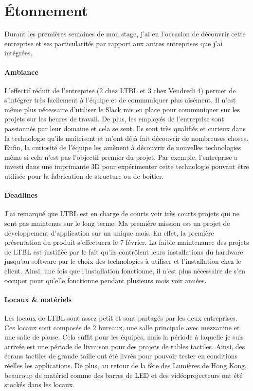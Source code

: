 \documentclass{article}
\begin{document}
\section{Étonnement}

Durant les premières semaines de mon stage, j'ai eu l'occasion de découvrir cette entreprise et ses particularités par rapport aux autres entreprises que j'ai intégrées.

\paragraph{Ambiance} L'effectif réduit de l'entreprise (2 chez LTBL et 3 chez Vendredi 4) permet de s'intégrer très facilement à l'équipe et de communiquer plus aisément.
Il n'est même plus nécessaire d'utiliser le Slack mis en place pour communiquer sur les projets sur les heures de travail.
De plus, les employés de l'entreprise sont passionnés par leur domaine et cela se sent.
Ils sont très qualifiés et curieux dans la technologie qu'ils maîtrisent et m'ont déjà fait découvrir de nombreuses choses.
Enfin, la curiosité de l'équipe les amènent à découvrir de nouvelles technologies même si cela n'est pas l'objectif premier du projet.
Par exemple, l'entreprise a investi dans une imprimante 3D pour expérimenter cette technologie pouvant être utilisée pour la fabrication de structure ou de boîtier.

\paragraph{Deadlines} J'ai remarqué que LTBL est en charge de courts voir très courts projets qui ne sont pas maintenus sur le long terme.
Ma première mission est un projet de développement d'application sur un unique mois.
En effet, la première présentation du produit s'effectuera le 7 février.
La faible maintenance des projets de LTBL est justifiée par le fait qu'ils contrôlent leurs installations du hardware jusqu'au software par le choix des technologies à utiliser et l'installation chez le client.
Ainsi, une fois que l'installation fonctionne, il n'est plus nécessaire de s'en occuper pour qu'elle fonctionne pendant plusieurs mois voir années.

\paragraph{Locaux \& matériels} Les locaux de LTBL sont assez petit et sont partagés par les deux entreprises.
Ces locaux sont composés de 2 bureaux, une salle principale avec mezzanine et une salle de pause.
Cela suffit pour les équipes, mais la période à laquelle je suis arrivée est une période de livraison pour des projets de tables tactiles.
Ainsi, des écrans tactiles de grande taille ont été livrés pour pouvoir tester en conditions réelles les applications.
De plus, au retour de la fête des Lumières de Hong Kong, beaucoup de matériel comme des barres de LED et des vidéoprojecteurs ont été stockés dans les locaux.
\end{document}
